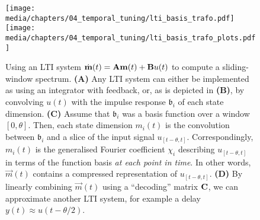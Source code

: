 \begin{figure}
	\centering
	\texttt{[image: media/chapters/04\_temporal\_tuning/lti\_basis\_trafo.pdf]}%
	{\label{fig:lti_basis_trafo_a}}%
	{\label{fig:lti_basis_trafo_b}}%
	{\label{fig:lti_basis_trafo_c}}%
	{\label{fig:lti_basis_trafo_d}}%
	\kern-158mm\texttt{[image: media/chapters/04\_temporal\_tuning/lti\_basis\_trafo\_plots.pdf]}\\[0.3cm]
	\caption[Using an LTI system to compute a sliding basis transformation]{Using an LTI system $\dot{\mathbf{m}}(t) = \mathbf{A} \mathbf{m}(t) + \mathbf{B} u(t)$ to compute a sliding-window spectrum.
	\textbf{(A)} Any LTI system can either be implemented as using an integrator with feedback, or, as is depicted in \textbf{(B)}, by convolving $u(t)$ with the impulse response $\mathfrak{b}_i$ of each state dimension.
	\textbf{(C)} Assume that $\mathfrak{b}_i$ was a basis function over a window $[0, \theta]$.
	Then, each state dimension $m_i(t)$ is the convolution between $\mathfrak{b}_i$ and a slice of the input signal $u_{[t - \theta, t]}$.
	Correspondingly, $m_i(t)$ is the generalised Fourier coefficient $\chi_i$ describing $u_{[t - \theta, t]}$ in terms of the function basis \emph{at each point in time}.
	In other words, $\vec m(t)$ contains a compressed representation of $u_{[t - \theta, t]}$.
	\textbf{(D)} By linearly combining $\vec m(t)$ using a \enquote{decoding} matrix $\mathbf{C}$, we can approximate another LTI system, for example a delay $y(t) \approx u(t - \theta / 2)$.
	}
	\label{fig:lti_basis_trafo}
\end{figure}

